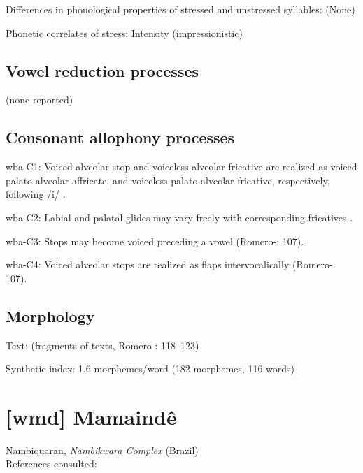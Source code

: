 {\begin{appendixdesc}
\item[Differences in phonological properties of stressed and unstressed syllables:] (None)

\item[Phonetic correlates of stress:] Intensity (impressionistic)
\end{appendixdesc}
\subsection*{Vowel reduction processes}

(none reported)
\subsection*{Consonant allophony processes}
\begin{appendixdesc}

\item[wba-C1:] Voiced alveolar stop and voiceless alveolar fricative are realized as voiced palato-alveolar affricate, and voiceless palato-alveolar fricative, respectively, following /i/ \citep[121]{Arinterol2000}.

\item[wba-C2:] Labial and palatal glides may vary freely with corresponding fricatives \citep[122]{Arinterol2000}.

\item[wba-C3:] Stops may become voiced preceding a vowel (Romero-\citealt{Figeroa1997}: 107).

\item[wba-C4:] Voiced alveolar stops are realized as flaps intervocalically (Romero-\citealt{Figeroa1997}: 107).
\end{appendixdesc}
\subsection*{Morphology}

\begin{appendixdesc}

\item[Text:] (fragments of texts, Romero-\citealt{Figeroa1997}: 118--123)

\item[Synthetic index:] 1.6 morphemes/word (182 morphemes, 116 words)
\end{appendixdesc}

\section*{[wmd] Mamaindê} %
Nambiquaran, \textit{Nambikwara Complex} (Brazil)\medskip\\
References consulted: \citet{Eberhard2009}

}
